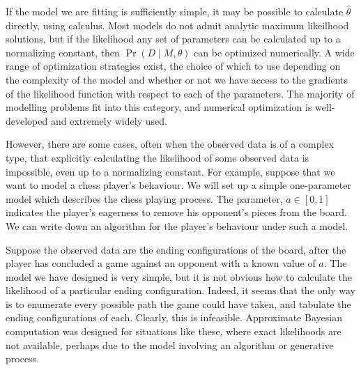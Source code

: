 If the model we are fitting is sufficiently simple, it may be possible to
calculate $\hat{\theta}$ directly, using calculus. Most models do not admit
analytic maximum likeilhood solutions, but if the likelihood any set of
parameters can be calculated up to a normalizing constant, then
${\Pr(D \mid M,\theta)}$ can be optimized numerically. A wide range of
optimization strategies exist, the choice of which to use depending on the
complexity of the model and whether or not we have access to the gradients of
the likelihood function with respect to each of the parameters. The majority of
modelling problems fit into this category, and numerical optimization is
well-developed and extremely widely used.

However, there are some cases, often when the observed data is of a complex
type, that explicitly calculating the likelihood of some observed data is
impossible, even up to a normalizing constant. For example, suppose that we
want to model a chess player's behaviour. We will set up a simple one-parameter
model which describes the chess playing process.  The parameter, $a \in [0, 1]$
indicates the player's eagerness to remove his opponent's pieces from the
board. We can write down an algorithm for the player's behaviour under such a
model.


\begin{algorithmic}
    \Else
    \EndIf
  \EndWhile
\end{algorithmic}

Suppose the observed data are the ending configurations of the board, after the
player has concluded a game against an opponent with a known value of $a$. The
model we have designed is very simple, but it is not obvious how to calculate
the likelihood of a particular ending configuration. Indeed, it seems that the
only way is to enumerate every possible path the game could have taken, and
tabulate the ending configurations of each. Clearly, this is infeasible.
Approximate Bayesian computation was designed for situations like these, where
exact likelihoods are not available, perhaps due to the model involving an
algorithm or generative process.
